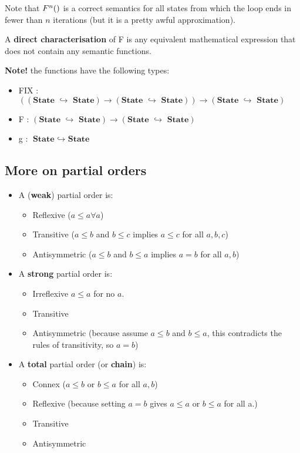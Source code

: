 \documentclass[11pt,a4paper,titlepage,dvipsnames,cmyk]{scrartcl}
\newcommand\pfun{\hookrightarrow}
\begin{document}
Note that $F^n(\empty)$ is a correct semantics for all states from which
the loop ends in fewer than $n$ iterations (but it is a pretty awful
approximation).

A \textbf{direct characterisation} of F is any equivalent mathematical
expression that does not contain any semantic functions.

\newpage
\textbf{Note!} the functions have the following types:
\begin{itemize}
    \item FIX : $(( \textbf{State } \pfun \textbf{ State} ) \rightarrow (
        \textbf{State } \pfun \textbf{ State} ))\rightarrow (
        \textbf{State } \pfun \textbf{ State} )$
    \item F : $(\textbf{State } \pfun \textbf{ State} ) \rightarrow (
        \textbf{State } \pfun \textbf{ State} )$
    \item g : $ \textbf{State } \pfun \textbf{ State}$
\end{itemize}

\subsection{More on partial orders}%
\label{sub:partial-order-2}
\begin{itemize}
    \item A (\textbf{weak}) partial order is:
        \begin{itemize}
            \item Reflexive ($a \le a \forall a$)
            \item Transitive ($a \le b$ and $b \le c$ implies $a \le c$
                for all $a,b,c$)
            \item Antisymmetric ($a \le b$ and $b \le a$ implies $a = b$
                for all $a,b$)
        \end{itemize}
    \item  A \textbf{strong} partial order is:
        \begin{itemize}
            \item Irreflexive $a \le a$ for no $a$.
            \item Transitive
            \item Antisymmetric (because assume $a \le b$ and $b \le a$,
                this contradicts the rules of transitivity, so $a = b$)
        \end{itemize}
    \item A \textbf{total} partial order (or \textbf{chain}) is:
        \begin{itemize}
            \item Connex ($a \le b$ or $b \le a$ for all $a, b$)
            \item Reflexive (because setting $a = b$ gives $a \le a$ or $b
                \le a$ for all a.)
            \item Transitive
            \item Antisymmetric
        \end{itemize}
\end{itemize}
\end{document}
